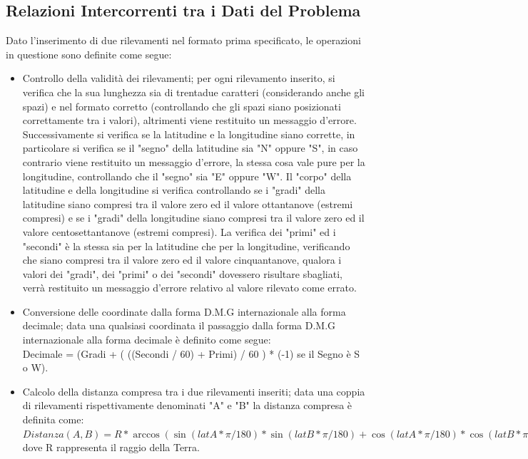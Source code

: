 \documentclass{article}
\begin{document}
\subsection{Relazioni Intercorrenti tra i Dati del Problema}
Dato l'inserimento di due rilevamenti nel formato prima specificato, le operazioni in questione sono definite come segue:
\begin{itemize}
	\item Controllo della validità dei rilevamenti; per ogni rilevamento inserito, si verifica che la sua lunghezza sia di trentadue caratteri (considerando anche gli spazi) e nel formato corretto (controllando che gli spazi siano posizionati correttamente tra i valori), altrimenti viene restituito un messaggio d'errore. Successivamente si verifica se la latitudine e la longitudine siano corrette, in particolare si verifica se il "segno" della latitudine sia "N" oppure "S", in caso contrario viene restituito un messaggio d'errore, la stessa cosa vale pure per la longitudine, controllando che il "segno" sia "E" oppure "W". Il "corpo" della latitudine e della longitudine si verifica controllando se i "gradi" della latitudine siano compresi tra il valore zero ed il valore ottantanove (estremi compresi) e se i "gradi" della longitudine siano compresi tra il valore zero ed il valore centosettantanove (estremi compresi). La verifica dei "primi" ed i "secondi" è la stessa sia per la latitudine che per la longitudine, verificando che siano compresi tra il valore zero ed il valore cinquantanove, qualora i valori dei "gradi", dei "primi" o dei "secondi" dovessero risultare sbagliati, verrà restituito un messaggio d'errore relativo al valore rilevato come errato.
	
	\item Conversione delle coordinate dalla forma D.M.G internazionale alla forma decimale; data una qualsiasi coordinata il passaggio dalla forma D.M.G internazionale alla forma decimale è definito come segue: \\
	Decimale = (Gradi + ( ((Secondi / 60) + Primi) / 60 ) * (-1) se il Segno è  S o W).
	
	\item Calcolo della distanza compresa tra i due rilevamenti inseriti;  data una coppia di rilevamenti rispettivamente denominati "A" e "B" la distanza compresa è definita come: \\
	$Distanza(A, B) = R * \arccos(\sin(latA * \pi / 180) * \sin(latB * \pi / 180) + \cos(latA * \pi / 180) * \cos(latB * \pi / 180) * \cos((lonA - lonB) * \pi / 180)). $\\
	dove R rappresenta il raggio della Terra.
	

\end{itemize}
\end{document}

